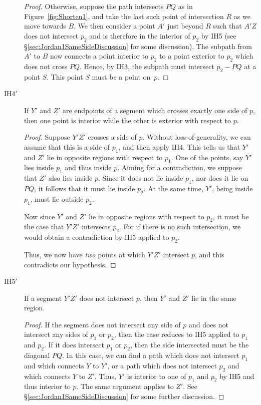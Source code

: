 \begin{description}
\begin{proof}
Otherwise, suppose the path intersects $PQ$ as in Figure~\ref{fig:Shorten1}, and take the last such point of intersection $R$ as we move towards $B$. We then consider a point $A'$ just beyond $R$ such that $A'Z$ does not intersect $p_2$ and is therefore in the interior of $p_2$ by IH5 (see \S\ref{sec:Jordan1SameSideDiscussion} for some discussion). The subpath from $A'$ to $B$ now connects a point interior to $p_2$ to a point exterior to $p_2$ which does not cross $PQ$. Hence, by IH3, the subpath must intersect $p_2 - PQ$ at a point $S$. This point $S$ must be a point on~$p$.
  \end{proof}
\item[IH{4}$'$] If $Y'$ and $Z'$ are endpoints of a segment which crosses exactly one side of $p$, then one point is interior while the other is exterior with respect to $p$.
  \begin{proof}
    Suppose $Y'Z'$ crosses a side of $p$. Without loss-of-generality, we can assume that this is a side of $p_1$, and then apply IH4. This tells us that $Y'$ and $Z'$ lie in opposite regions with respect to $p_1$. One of the points, say $Y'$ lies inside $p_1$ and thus inside $p$. Aiming for a contradiction, we suppose that $Z'$ also lies inside $p$. Since it does not lie inside $p_1$, nor does it lie on $PQ$, it follows that it must lie inside $p_2$. At the same time, $Y'$, being inside $p_1$, must lie outside $p_2$.

Now since $Y'$ and $Z'$ lie in opposite regions with respect to $p_2$, it must be the case that $Y'Z'$ intersects $p_2$. For if there is no such intersection, we would obtain a contradiction by IH5 applied to $p_2$. 

Thus, we now have \emph{two} points at which $Y'Z'$ intersect $p$, and this contradicts our hypothesis.
  \end{proof}
\item[IH{5}$'$] If a segment $Y'Z'$ does not intersect $p$, then $Y'$ and $Z'$ lie in the same region.
  \begin{proof}
    If the segment does not intersect any side of $p$ and does not intersect any sides of $p_1$ or $p_2$, then the case reduces to IH5 applied to $p_1$ and $p_2$. If it does intersect $p_1$ or $p_2$, then the side intersected must be the diagonal $PQ$. In this case, we can find a path which does not intersect $p_1$ and which connects $Y$ to $Y'$, or a path which does not intersect $p_2$ and which connects $Y$ to $Z'$. Thus, $Y'$ is interior to one of $p_1$ and $p_2$ by IH5 and thus interior to $p$. The same argument applies to $Z'$. See \S\ref{sec:Jordan1SameSideDiscussion} for some further discussion. %
  \end{proof}
\end{description}

